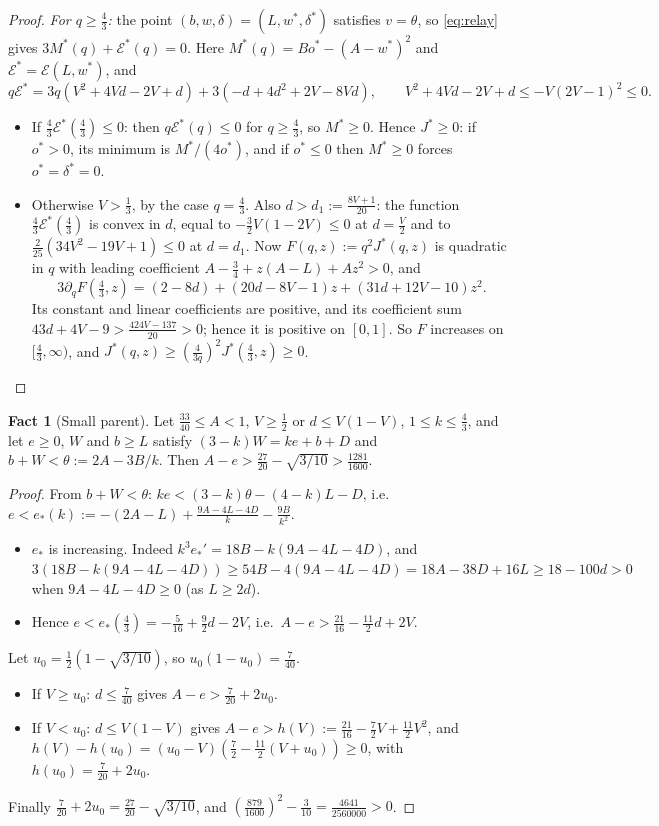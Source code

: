 \documentclass[11pt,a4paper]{article}
\numberwithin{equation}{section}
\theoremstyle{definition}
\newtheorem{fact}{Fact}
\newcommand{\cE}{\mathcal E}
\begin{document}
\begin{proof}
\emph{For $q\ge\frac43$:} the point $(b,w,\delta)=(L,w^*,\delta^*)$ satisfies
$v=\theta$, so \eqref{eq:relay} gives $3M^*(q)+\cE^*(q)=0$. Here
$M^*(q)=Bo^*-(A-w^*)^2$ and $\cE^*=\cE(L,w^*)$, and
\[
q\cE^*=3q(V^2+4Vd-2V+d)+3(-d+4d^2+2V-8Vd),\qquad V^2+4Vd-2V+d\le-V(2V-1)^2\le0.
\]
\begin{itemize}
\item If $\frac43\cE^*(\frac43)\le0$: then $q\cE^*(q)\le0$ for $q\ge\frac43$, so
$M^*\ge0$. Hence $J^*\ge0$: if $o^*>0$, its minimum is $M^*/(4o^*)$, and if
$o^*\le0$ then $M^*\ge0$ forces $o^*=\delta^*=0$.
\item Otherwise $V>\frac13$, by the case $q=\frac43$. Also
$d>d_1:=\frac{8V+1}{20}$: the function $\frac43\cE^*(\frac43)$ is convex in $d$,
equal to $-\frac32V(1-2V)\le0$ at $d=\frac V2$ and to
$\frac2{25}(34V^2-19V+1)\le0$ at $d=d_1$. Now $F(q,z):=q^2J^*(q,z)$ is
quadratic in $q$ with leading coefficient $A-\frac34+z(A-L)+Az^2>0$, and
\[
3\partial_qF(\tfrac43,z)=(2-8d)+(20d-8V-1)z+(31d+12V-10)z^2 .
\]
Its constant and linear coefficients are positive, and its coefficient sum
$43d+4V-9>\frac{424V-137}{20}>0$; hence it is positive on $[0,1]$. So $F$
increases on $[\frac43,\infty)$, and
$J^*(q,z)\ge(\frac4{3q})^2J^*(\frac43,z)\ge0$. \qedhere
\end{itemize}
\end{proof}

\begin{fact}[Small parent]\label{fact:smallparent}Let $\frac{33}{40}\le A<1$, $V\ge\frac12$ or $d\le V(1-V)$,
$1\le k\le\frac43$, and let $e\ge0$, $W$ and $b\ge L$ satisfy
$(3-k)W=ke+b+D$ and $b+W<\theta:=2A-3B/k$. Then
$A-e>\frac{27}{20}-\sqrt{3/10}>\frac{1281}{1600}$.
\end{fact}
\begin{proof}
From $b+W<\theta$:
$ke<(3-k)\theta-(4-k)L-D$, i.e.\
$e<e_*(k):=-(2A-L)+\frac{9A-4L-4D}k-\frac{9B}{k^2}$.
\begin{itemize}
\item $e_*$ is increasing. Indeed $k^3e_*'=18B-k(9A-4L-4D)$, and
$3(18B-k(9A-4L-4D))\ge54B-4(9A-4L-4D)=18A-38D+16L\ge18-100d>0$ when
$9A-4L-4D\ge0$ (as $L\ge2d$).
\item Hence $e<e_*(\frac43)=-\frac5{16}+\frac92d-2V$, i.e.\
$A-e>\frac{21}{16}-\frac{11}2d+2V$.
\end{itemize}
Let $u_0=\frac12(1-\sqrt{3/10})$, so $u_0(1-u_0)=\frac7{40}$.
\begin{itemize}
\item If $V\ge u_0$: $d\le\frac7{40}$ gives $A-e>\frac7{20}+2u_0$.
\item If $V<u_0$: $d\le V(1-V)$ gives $A-e>h(V):=\frac{21}{16}-\frac72V+\frac{11}2V^2$,
and $h(V)-h(u_0)=(u_0-V)(\frac72-\frac{11}2(V+u_0))\ge0$, with
$h(u_0)=\frac7{20}+2u_0$.
\end{itemize}
Finally $\frac7{20}+2u_0=\frac{27}{20}-\sqrt{3/10}$, and
$(\frac{879}{1600})^2-\frac3{10}=\frac{4641}{2560000}>0$.
\end{proof}
\end{document}

